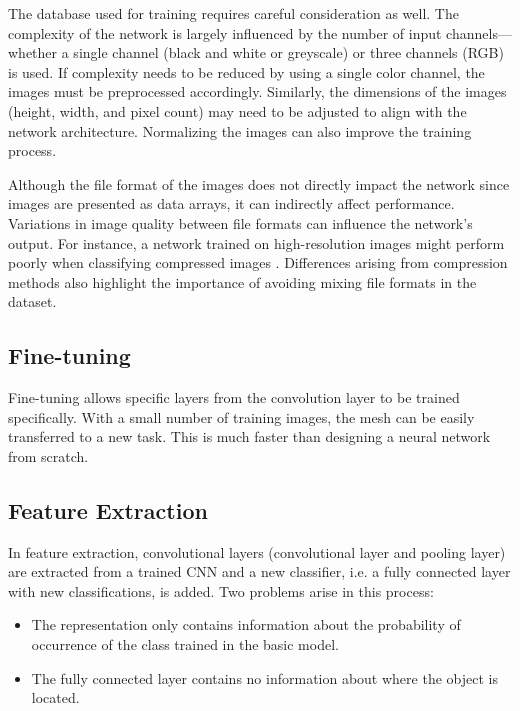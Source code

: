 The database used for training requires careful consideration as well. The complexity of the network is largely influenced by the number of input channels—whether a single channel (black and white or greyscale) or three channels (RGB) is used. If complexity needs to be reduced by using a single color channel, the images must be preprocessed accordingly. Similarly, the dimensions of the images (height, width, and pixel count) may need to be adjusted to align with the network architecture. Normalizing the images can also improve the training process.

Although the file format of the images does not directly impact the network since images are presented as data arrays, it can indirectly affect performance. Variations in image quality between file formats can influence the network’s output. For instance, a network trained on high-resolution images might perform poorly when classifying compressed images \cite{Dodge:2016}. Differences arising from compression methods also highlight the importance of avoiding mixing file formats in the dataset.

\subsection{Fine-tuning}

Fine-tuning allows specific layers from the convolution layer to be trained specifically. With a small number of training images, the mesh can be easily transferred to a new task. This is much faster than designing a neural network from scratch. \cite{Chollet:2018}		

\subsection{Feature Extraction}

In feature extraction, convolutional layers (convolutional layer and pooling layer) are extracted from a trained CNN and a new classifier, i.e. a fully connected layer with new classifications, is added. Two problems arise in this process:

\begin{itemize}
	\item The representation only contains information about the probability of occurrence of the class trained in the basic model.
	\item The fully connected layer contains no information about where the object is located.
\end{itemize}

